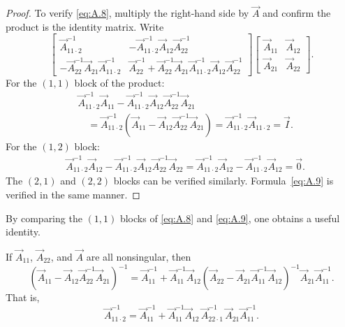 \begin{proof}
To verify \eqref{eq:A.8}, multiply the right-hand side by $\vec{A}$ and
confirm the product is the identity matrix.  Write
\[
  \begin{bmatrix}
    \vec{A}_{11 \cdot 2}^{-1} &
      -\vec{A}_{11 \cdot 2}^{-1}\vec{A}_{12}\vec{A}_{22}^{-1} \\[4pt]
    -\vec{A}_{22}^{-1}\vec{A}_{21}\vec{A}_{11 \cdot 2}^{-1} &
      \vec{A}_{22}^{-1} + \vec{A}_{22}^{-1}\vec{A}_{21}
        \vec{A}_{11 \cdot 2}^{-1}\vec{A}_{12}\vec{A}_{22}^{-1}
  \end{bmatrix}
  \begin{bmatrix}
    \vec{A}_{11} & \vec{A}_{12} \\
    \vec{A}_{21} & \vec{A}_{22}
  \end{bmatrix}.
\]
For the $(1,1)$ block of the product:
\begin{align*}
  &\vec{A}_{11 \cdot 2}^{-1}\vec{A}_{11}
    - \vec{A}_{11 \cdot 2}^{-1}\vec{A}_{12}\vec{A}_{22}^{-1}\vec{A}_{21} \\
  &\quad = \vec{A}_{11 \cdot 2}^{-1}
    (\vec{A}_{11} - \vec{A}_{12}\vec{A}_{22}^{-1}\vec{A}_{21})
  = \vec{A}_{11 \cdot 2}^{-1}\vec{A}_{11 \cdot 2}
  = \vec{I}.
\end{align*}
For the $(1,2)$ block:
\begin{align*}
  &\vec{A}_{11 \cdot 2}^{-1}\vec{A}_{12}
    - \vec{A}_{11 \cdot 2}^{-1}\vec{A}_{12}\vec{A}_{22}^{-1}\vec{A}_{22}
  = \vec{A}_{11 \cdot 2}^{-1}\vec{A}_{12}
    - \vec{A}_{11 \cdot 2}^{-1}\vec{A}_{12}
  = \vec{0}.
\end{align*}
The $(2,1)$ and $(2,2)$ blocks can be verified similarly.
Formula~\eqref{eq:A.9} is verified in the same manner.
\end{proof}

By comparing the $(1,1)$ blocks of \eqref{eq:A.8} and \eqref{eq:A.9},
one obtains a useful identity.

\begin{proposition}
\label{prop:matrix-inversion-lemma}
If $\vec{A}_{11}$, $\vec{A}_{22}$, and $\vec{A}$ are all nonsingular,
then
\begin{equation}
  (\vec{A}_{11} - \vec{A}_{12}\vec{A}_{22}^{-1}\vec{A}_{21})^{-1}
  = \vec{A}_{11}^{-1} + \vec{A}_{11}^{-1}\vec{A}_{12}
    (\vec{A}_{22} - \vec{A}_{21}\vec{A}_{11}^{-1}\vec{A}_{12})^{-1}
    \vec{A}_{21}\vec{A}_{11}^{-1}.
  \label{eq:A.10}
\end{equation}
That is,
\begin{equation}
  \vec{A}_{11 \cdot 2}^{-1}
  = \vec{A}_{11}^{-1} + \vec{A}_{11}^{-1}\vec{A}_{12}\,
    \vec{A}_{22 \cdot 1}^{-1}\,
    \vec{A}_{21}\vec{A}_{11}^{-1}.
  \label{eq:A.11}
\end{equation}
\end{proposition}


